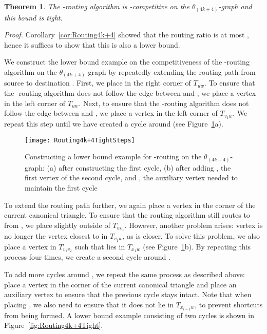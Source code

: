 \documentclass[12pt]{article}
\newtheorem{theo}[defin]{Theorem}
\newenvironment{theorem}{\begin{theo} \sl}{\end{theo}}
\newenvironment{proof}{\emph{Proof.}}{\hfill \\}
\newcommand{\graph}[1]{\ensuremath{\theta_{(4 k + #1)}}-graph\xspace}
\newcommand{\canon}[2]{\ensuremath{T_{#1 #2}}}
\begin{document}
\begin{theorem}
  The -routing algorithm is -competitive on the \graph{4} and this bound is tight. 
\end{theorem}
\begin{proof}
  Corollary~\ref{cor:Routing4k+4} showed that the routing ratio is at most , hence it suffices to show that this is also a lower bound. 

  We construct the lower bound example on the competitiveness of the -routing algorithm on the \graph{4} by repeatedly extending the routing path from source  to destination . First, we place  in the right corner of \canon{u}{w}. To ensure that the -routing algorithm does not follow the edge between  and , we place a vertex  in the left corner of \canon{u}{w}. Next, to ensure that the -routing algorithm does not follow the edge between  and , we place a vertex  in the left corner of \canon{v_1}{w}. We repeat this step until we have created a cycle around  (see Figure~\ref{fig:Routing4k+4TightSteps}a). 

  \begin{figure}[ht]
    \centering
    \texttt{[image: Routing4k+4TightSteps]}
    \caption{Constructing a lower bound example for -routing on the \graph{4}: (a) after constructing the first cycle, (b) after adding , the first vertex of the second cycle, and , the auxiliary vertex needed to maintain the first cycle}
    \label{fig:Routing4k+4TightSteps}
  \end{figure}

  To extend the routing path further, we again place a vertex  in the corner of the current canonical triangle. To ensure that the routing algorithm still routes to  from , we place  slightly outside of \canon{u}{v_1}. However, another problem arises: vertex  is no longer the vertex closest to  in \canon{v_1}{w}, as  is closer. To solve this problem, we also place a vertex  in \canon{v_1}{v_2} such that  lies in \canon{x_1}{w} (see Figure~\ref{fig:Routing4k+4TightSteps}b). By repeating this process four times, we create a second cycle around . 

  To add more cycles around , we repeat the same process as described above: place a vertex in the corner of the current canonical triangle and place an auxiliary vertex to ensure that the previous cycle stays intact. Note that when placing , we also need to ensure that it does not lie in \canon{x_{i-1}}{w}, to prevent shortcuts from being formed. A lower bound example consisting of two cycles is shown in Figure~\ref{fig:Routing4k+4Tight}.


\end{proof}
\end{document}

